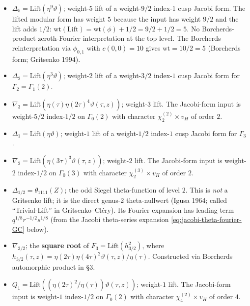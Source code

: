 \begin{itemize}
\item $\Delta_5 = \mathrm{Lift}(\eta^9 \vartheta)$; weight-$5$ lift of
a weight-$9/2$ index-$1$ cusp Jacobi form. The lifted modular form has
weight $5$ because the input has weight $9/2$ and the lift adds $1/2$:
$\mathrm{wt}(\mathrm{Lift}) = \mathrm{wt}(\phi) + 1/2 = 9/2 + 1/2 = 5$.
No Borcherds-product zeroth-Fourier interpretation at the top level.
The Borcherds reinterpretation via $\phi_{0, 1}$ with $c(0, 0) = 10$
gives $\mathrm{wt} = 10/2 = 5$ (Borcherds form; Gritsenko 1994).

\item $\Delta_2 = \mathrm{Lift}(\eta^3 \vartheta)$; weight-$2$ lift of
a weight-$3/2$ index-$1$ cusp Jacobi form for $\Gamma_2 = \Gamma_1(2)$.

\item $\nabla_3 = \mathrm{Lift}(\eta(\tau) \eta(2\tau)^4 \vartheta(\tau,
z))$; weight-$3$ lift. The Jacobi-form input is weight-$5/2$ index-$1/2$
on $\Gamma_0(2)$ with character $\chi_2^{(2)} \times v_H$ of order $2$.

\item $\Delta_1 = \mathrm{Lift}(\eta \vartheta)$; weight-$1$ lift of a
weight-$1/2$ index-$1$ cusp Jacobi form for $\Gamma_3$.

\item $\nabla_2 = \mathrm{Lift}(\eta(3\tau)^3 \vartheta(\tau, z))$;
weight-$2$ lift. The Jacobi-form input is weight-$2$ index-$1/2$ on
$\Gamma_0(3)$ with character $\chi_2^{(3)} \times v_H$ of order $2$.

\item $\Delta_{1/2} = \theta_{1111}(Z)$; the odd Siegel theta-function
of level $2$. This is \emph{not} a Gritsenko lift; it is the direct
genus-$2$ theta-nullwert (Igusa 1964; called ``Trivial-Lift'' in
Gritsenko--Cl\'ery). Its Fourier expansion has leading term
$q^{1/8} r^{-1/2} s^{1/8}$ (from the Jacobi theta-series expansion
\eqref{eq:jacobi-theta-fourier-GC} below).

\item $\nabla_{3/2}$; the \textbf{square root} of
$F_3 = \mathrm{Lift}(h_{3/2}^2)$, where $h_{3/2}(\tau, z) =
\eta(2\tau)\eta(4\tau)^2 \vartheta(\tau, z)/\eta(\tau)$. Constructed
via Borcherds automorphic product in \S 3.

\item $Q_1 = \mathrm{Lift}((\eta(2\tau)^2 / \eta(\tau)) \vartheta(\tau,
z))$; weight-$1$ lift. The Jacobi-form input is weight-$1$
index-$1/2$ on $\Gamma_0(2)$ with character $\chi_4^{(2)} \times v_H$
of order $4$.
\end{itemize}

